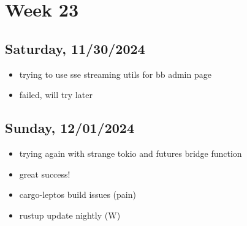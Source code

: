 \newpage
\section{Week 23}

\subsection{Saturday, 11/30/2024}
\begin{itemize}
    \item trying to use sse streaming utils for bb admin page
    \item failed, will try later
\end{itemize}

\subsection{Sunday, 12/01/2024}
\begin{itemize}
    \item trying again with strange tokio and futures bridge function
    \item great success!
    \item cargo-leptos build issues (pain)
    \item rustup update nightly (W) 
\end{itemize}
